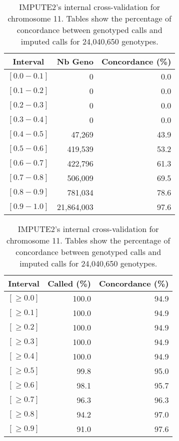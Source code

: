 \documentclass[10pt,twoside,english]{scrartcl}
\begin{document}
\begin{table}[H]
\protect\caption{IMPUTE2's internal cross-validation for chromosome 11. Tables show the
percentage of concordance between genotyped calls and imputed calls
for 24,040,650 genotypes.\label{tab:cross_validation_chr_11}}

\centering

\begin{tabular}{crr}
\hline 
\multicolumn{1}{c}{\textbf{Interval}}
 & \multicolumn{1}{c}{\textbf{Nb Geno}}
 & \multicolumn{1}{c}{\textbf{Concordance (\%)}}
\\
\hline 

$[0.0-0.1]$ & 0 & 0.0\\
$[0.1-0.2]$ & 0 & 0.0\\
$[0.2-0.3]$ & 0 & 0.0\\
$[0.3-0.4]$ & 0 & 0.0\\
$[0.4-0.5]$ & 47,269 & 43.9\\
$[0.5-0.6]$ & 419,539 & 53.2\\
$[0.6-0.7]$ & 422,796 & 61.3\\
$[0.7-0.8]$ & 506,009 & 69.5\\
$[0.8-0.9]$ & 781,034 & 78.6\\
$[0.9-1.0]$ & 21,864,003 & 97.6\\
\hline 
\end{tabular}
\hfill
\begin{tabular}{crr}
\hline 
\multicolumn{1}{c}{\textbf{Interval}}
 & \multicolumn{1}{c}{\textbf{Called (\%)}}
 & \multicolumn{1}{c}{\textbf{Concordance (\%)}}
\\
\hline 

$[\geq 0.0]$ & 100.0 & 94.9\\
$[\geq 0.1]$ & 100.0 & 94.9\\
$[\geq 0.2]$ & 100.0 & 94.9\\
$[\geq 0.3]$ & 100.0 & 94.9\\
$[\geq 0.4]$ & 100.0 & 94.9\\
$[\geq 0.5]$ & 99.8 & 95.0\\
$[\geq 0.6]$ & 98.1 & 95.7\\
$[\geq 0.7]$ & 96.3 & 96.3\\
$[\geq 0.8]$ & 94.2 & 97.0\\
$[\geq 0.9]$ & 91.0 & 97.6\\
\hline 
\end{tabular}


\end{table}
\end{document}
